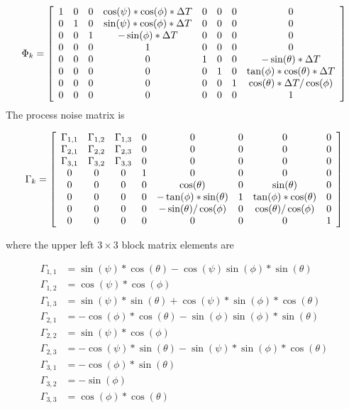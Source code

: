 \begin{align*}
\Phi_k = \left[\begin{array}{c c c c c c c c}
1 & 0 & 0 & \cos(\psi)*\cos(\phi)*\Delta T & 0 & 0 & 0 & 0 \\
0 & 1 & 0 & \sin(\psi)*\cos(\phi)*\Delta T & 0 & 0 & 0 & 0\\
0 & 0 & 1 & -\sin(\phi)*\Delta T & 0 & 0 & 0 & 0\\
0 & 0 & 0 & 1 & 0 & 0 & 0 & 0 \\
0 & 0 & 0 & 0 & 1 & 0 & 0 & -\sin(\theta)*\Delta T \\
0 & 0 & 0 & 0 & 0 & 1 & 0 & \tan(\phi)*\cos(\theta)*\Delta T \\
0 & 0 & 0 & 0 & 0 & 0 & 1 & \cos(\theta)*\Delta T/\cos(\phi)\\
0 & 0 & 0 & 0 & 0 & 0 & 0 & 1
\end{array}\right]
\end{align*}
The process noise matrix is

\begin{align*}
\Gamma_k = \left[\begin{array}{c c c c c c c c}
\Gamma_{1,1} & \Gamma_{1,2} & \Gamma_{1,3} & 0 & 0 & 0 & 0 & 0 \\
\Gamma_{2,1} & \Gamma_{2,2} & \Gamma_{2,3} & 0 & 0 & 0 & 0 & 0 \\
\Gamma_{3,1} & \Gamma_{3,2} & \Gamma_{3,3} & 0 & 0 & 0 & 0 & 0 \\
0 & 0 & 0 & 1 & 0 & 0 & 0 & 0 \\
0 & 0 & 0 & 0 & \cos(\theta) & 0 & \sin(\theta) & 0 \\
0 & 0 & 0 & 0 & -\tan(\phi)*\sin(\theta) & 1 & \tan(\phi)*\cos(\theta) & 0 \\
0 & 0 & 0 & 0 & -\sin(\theta) / \cos(\phi) & 0 & \cos(\theta)/\cos(\phi) & 0 \\
0 & 0 & 0 & 0 & 0 & 0 & 0 & 1
\end{array}\right]
\end{align*}

where the upper left $3\times 3$ block matrix elements are

\begin{align*}
\Gamma_{1,1} &= \sin(\psi)*\cos(\theta)-\cos(\psi)\sin(\phi)*\sin(\theta) \\
\Gamma_{1,2} &= \cos(\psi)*\cos(\phi) \\
\Gamma_{1,3} &= \sin(\psi)*\sin(\theta)+\cos(\psi)*\sin(\phi)*\cos(\theta) \\
\Gamma_{2,1} &= -\cos(\phi)*\cos(\theta)-\sin(\phi)\sin(\phi)*\sin(\theta) \\
\Gamma_{2,2} &= \sin(\psi)*\cos(\phi) \\
\Gamma_{2,3} &= -\cos(\psi)*\sin(\theta)-\sin(\psi)*\sin(\phi)*\cos(\theta) \\
\Gamma_{3,1} &= -\cos(\phi)*\sin(\theta) \\
\Gamma_{3,2} &= -\sin(\phi) \\
\Gamma_{3,3} &= \cos(\phi)*\cos(\theta)
\end{align*}

